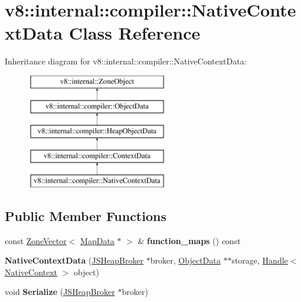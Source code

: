 \hypertarget{classv8_1_1internal_1_1compiler_1_1NativeContextData}{}\section{v8\+:\+:internal\+:\+:compiler\+:\+:Native\+Context\+Data Class Reference}
\label{classv8_1_1internal_1_1compiler_1_1NativeContextData}
Inheritance diagram for v8\+:\+:internal\+:\+:compiler\+:\+:Native\+Context\+Data\+:\begin{figure}[H]
\begin{center}
\leavevmode
\includegraphics[height=5.000000cm]{classv8_1_1internal_1_1compiler_1_1NativeContextData}
\end{center}
\end{figure}
\subsection*{Public Member Functions}
\begin{DoxyCompactItemize}
\item 
\mbox{\label{classv8_1_1internal_1_1compiler_1_1NativeContextData_ae4245a08f5e090db58a683042895a5cb}} 
const \mbox{\hyperlink{classv8_1_1internal_1_1ZoneVector}{Zone\+Vector}}$<$ \mbox{\hyperlink{classv8_1_1internal_1_1compiler_1_1MapData}{Map\+Data}} $\ast$ $>$ \& {\bfseries function\+\_\+maps} () const
\item 
\mbox{\label{classv8_1_1internal_1_1compiler_1_1NativeContextData_accb5f8587b5a29ba463c90b2ec52e81a}} 
{\bfseries Native\+Context\+Data} (\mbox{\hyperlink{classv8_1_1internal_1_1compiler_1_1JSHeapBroker}{J\+S\+Heap\+Broker}} $\ast$broker, \mbox{\hyperlink{classv8_1_1internal_1_1compiler_1_1ObjectData}{Object\+Data}} $\ast$$\ast$storage, \mbox{\hyperlink{classv8_1_1internal_1_1Handle}{Handle}}$<$ \mbox{\hyperlink{classv8_1_1internal_1_1NativeContext}{Native\+Context}} $>$ object)
\item 
\mbox{\label{classv8_1_1internal_1_1compiler_1_1NativeContextData_a229dbde0c6b5276025e44adcc04d80da}} 
void {\bfseries Serialize} (\mbox{\hyperlink{classv8_1_1internal_1_1compiler_1_1JSHeapBroker}{J\+S\+Heap\+Broker}} $\ast$broker)
\end{DoxyCompactItemize}
